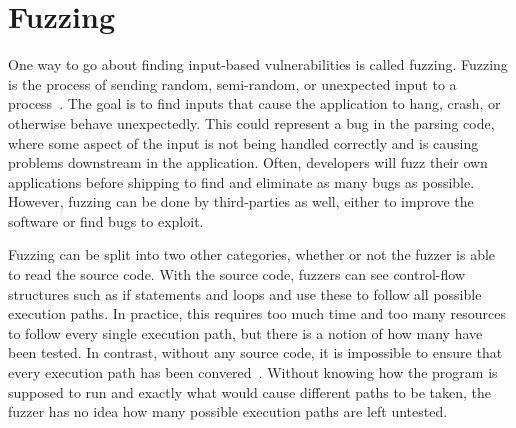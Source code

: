 \section{Fuzzing}
\label{sec:fuzzing}
One way to go about finding input-based vulnerabilities is called fuzzing.  Fuzzing is the process of sending random, semi-random, or unexpected input to a process~\cite[p 21--22]{fuzzing}.  The goal is to find inputs that cause the application to hang, crash, or otherwise behave unexpectedly.  This could represent a bug in the parsing code, where some aspect of the input is not being handled correctly and is causing problems downstream in the application.  Often, developers will fuzz their own applications before shipping to find and eliminate as many bugs as possible.  However, fuzzing can be done by third-parties as well, either to improve the software or find bugs to exploit.

Fuzzing can be split into two other categories, whether or not the fuzzer is able to read the source code.  With the source code, fuzzers can see control-flow structures such as if statements and loops and use these to follow all possible execution paths.  In practice, this requires too much time and too many resources to follow every single execution path, but there is a notion of how many have been tested.  In contrast, without any source code, it is impossible to ensure that every execution path has been convered~\cite{godefroid2012sage}.  Without knowing how the program is supposed to run and exactly what would cause different paths to be taken, the fuzzer has no idea how many possible execution paths are left untested.
